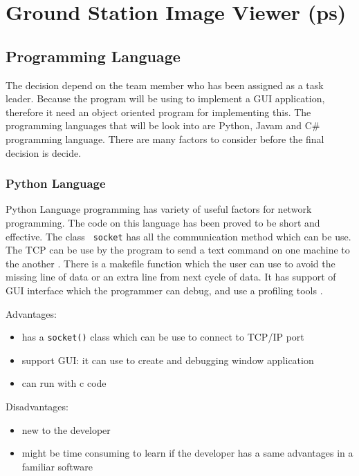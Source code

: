 
\section{Ground Station Image Viewer (ps)}

\subsection{Programming Language}

The decision depend on the team member who has been assigned as a task leader.
Because the program will be using to implement a GUI application, therefore it need an object oriented program for implementing this.
The programming languages that will be look into are Python, Javam and C\# programming language.
There are many factors to consider before the final decision is decide.

\subsubsection*{Python Language}
Python Language programming has variety of useful factors for network programming. 
The code on this language has been proved to be short and effective.
The class \texttt{ socket} has all the communication method which can be use. 
The TCP can be use by the program to send a text command on one machine to the another \cite{normanM}. 
There is a makefile function which the user can use to avoid the missing line of data or an extra line from next cycle of data\cite{normanM,guidoR}. 
It has support of GUI interface which the programmer can debug, and use a profiling tools \cite{sannerM}. 

Advantages:
\begin{itemize}
\item has a \texttt{socket()} class which can be use to connect to TCP/IP port
\item support GUI: it can use to create and debugging window application
\item can run with c code
\end{itemize}

Disadvantages:
\begin{itemize}
\item new to the developer
\item might be time consuming to learn if the developer has a same advantages in a familiar software
\end{itemize}

